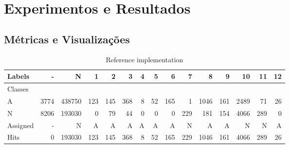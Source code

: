 


% 
% 

\chapter{Experimentos e Resultados}\label{cha:results}


% 

\section{Métricas e Visualizações}
\label{sec:experiments}


\begin{table}[hbt]%
{\scriptsize
\setlength\tabcolsep{0.5em}
\begin{center}
\caption{Reference implementation}
\label{tab:java-matrix}
\begin{tabular}{l *{14}{|r} }
  Labels   &     - &       N &    1 &    2 &    3 &  4 &   5 &    6 &    7 &     8 &    9 &    10 &   11 &  12 \\\hline
  Classes  &       &         &      &      &      &    &     &      &      &       &      &       &      &     \\\hline
  \hline
  A        &  3774 &  438750 &  123 &  145 &  368 &  8 &  52 &  165 &    1 &  1046 &  161 &  2489 &   71 &  26 \\\hline
  N        &  8206 &  193030 &    0 &   79 &   44 &  0 &   0 &    0 &  229 &   181 &  154 &  4066 &  289 &   0 \\\hline
  \hline
  Assigned &     - &       N &    A &    A &    A &  A &   A &    A &    N &     A &    A &     N &    N &   A \\\hline
  Hits     &     0 &  193030 &  123 &  145 &  368 &  8 &  52 &  165 &  229 &  1046 &  161 &  4066 &  289 &  26 
\end{tabular}
\end{center}
}
\end{table}

